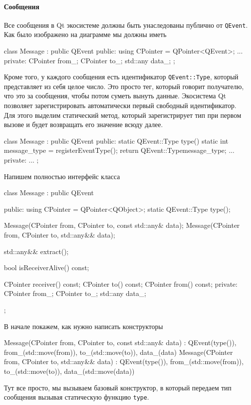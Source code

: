 \paragraph{Сообщения}

Все сообщения в Qt экосистеме должны быть унаследованы публично от \verb"QEvent".
Как было изображено на диаграмме мы должны иметь
\begin{cppcode}
class Message : public QEvent {
public:
  using CPointer = QPointer<QEvent>;
  ...
private:
  CPointer from_;
  CPointer to_;
  std::any data_;
};
\end{cppcode}
Кроме того, у каждого сообщения есть идентификатор \verb"QEvent::Type", который представляет из себя целое число.
Это просто тег, который говорит получателю, что это за сообщения, чтобы потом суметь вынуть данные.
Экосистема Qt позволяет зарегистрировать автоматически первый свободный идентификатор.
Для этого выделим статический метод, который зарегистрирует тип при первом вызове и будет возвращать его значение всюду далее.
\begin{cppcode}
class Message : public QEvent {
public:
  static QEvent::Type type() {
    static int message_type = registerEventType();
    return QEvent::Type{message_type};
  }
  ...
private:
  ...
};
\end{cppcode}
Напишем полностью интерфейс класса
\begin{cppcode}
class Message : public QEvent {
public:
  using CPointer = QPointer<QObject>;
  static QEvent::Type type();
  
  Message(CPointer from, CPointer to, const std::any& data);
  Message(CPointer from, CPointer to, std::any&& data);
  
  std::any&& extract();
  
  bool isReceiverAlive() const;
  
  CPointer receiver() const;
  CPointer to() const;
  CPointer from() const;
private:
  CPointer from_;
  CPointer to_;
  std::any data_;
};
\end{cppcode}
В начале покажем, как нужно написать конструкторы
\begin{cppcode}
Message(CPointer from, CPointer to, const std::any& data)
  : QEvent(type()), from_(std::move(from)), to_(std::move(to)),
    data_(data) {}
Message(CPointer from, CPointer to, std::any&& data)
  : QEvent(type()), from_(std::move(from)), to_(std::move(to)),
    data_(std::move(data)) {}
\end{cppcode}
Тут все просто, мы вызываем базовый конструктор, в который передаем тип сообщения вызывая статическую функцию \verb"type".
